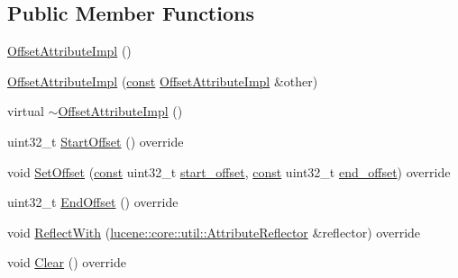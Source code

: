 \subsection*{Public Member Functions}
\begin{DoxyCompactItemize}
\item 
\mbox{\hyperlink{classlucene_1_1core_1_1analysis_1_1tokenattributes_1_1OffsetAttributeImpl_a424f18384e62360c38c1cd3e797dc80c}{Offset\+Attribute\+Impl}} ()
\item 
\mbox{\hyperlink{classlucene_1_1core_1_1analysis_1_1tokenattributes_1_1OffsetAttributeImpl_a1b302380db18cbe111ddc892b3b04841}{Offset\+Attribute\+Impl}} (\mbox{\hyperlink{ZlibCrc32_8h_a2c212835823e3c54a8ab6d95c652660e}{const}} \mbox{\hyperlink{classlucene_1_1core_1_1analysis_1_1tokenattributes_1_1OffsetAttributeImpl}{Offset\+Attribute\+Impl}} \&other)
\item 
virtual \mbox{\hyperlink{classlucene_1_1core_1_1analysis_1_1tokenattributes_1_1OffsetAttributeImpl_a6de20d33c5e4aed543d2386ccb3cef69}{$\sim$\+Offset\+Attribute\+Impl}} ()
\item 
uint32\+\_\+t \mbox{\hyperlink{classlucene_1_1core_1_1analysis_1_1tokenattributes_1_1OffsetAttributeImpl_afe05dd1af07cc98ff4baceb531ae5f0a}{Start\+Offset}} () override
\item 
void \mbox{\hyperlink{classlucene_1_1core_1_1analysis_1_1tokenattributes_1_1OffsetAttributeImpl_ab554b85bf6d64ce023c0634b3883c803}{Set\+Offset}} (\mbox{\hyperlink{ZlibCrc32_8h_a2c212835823e3c54a8ab6d95c652660e}{const}} uint32\+\_\+t \mbox{\hyperlink{classlucene_1_1core_1_1analysis_1_1tokenattributes_1_1OffsetAttributeImpl_a1e2b8c747f3f0216a9044b9fd61ea843}{start\+\_\+offset}}, \mbox{\hyperlink{ZlibCrc32_8h_a2c212835823e3c54a8ab6d95c652660e}{const}} uint32\+\_\+t \mbox{\hyperlink{classlucene_1_1core_1_1analysis_1_1tokenattributes_1_1OffsetAttributeImpl_a2e25d7e34687e7d39baaaf88636238c7}{end\+\_\+offset}}) override
\item 
uint32\+\_\+t \mbox{\hyperlink{classlucene_1_1core_1_1analysis_1_1tokenattributes_1_1OffsetAttributeImpl_a1e70ec558f605ea2313e41ba5c64e379}{End\+Offset}} () override
\item 
void \mbox{\hyperlink{classlucene_1_1core_1_1analysis_1_1tokenattributes_1_1OffsetAttributeImpl_ad7eb3a266863f7e14fbe1caa315c7151}{Reflect\+With}} (\mbox{\hyperlink{namespacelucene_1_1core_1_1util_a7dbb701adaed055f73fb95eec83da10a}{lucene\+::core\+::util\+::\+Attribute\+Reflector}} \&reflector) override
\item 
void \mbox{\hyperlink{classlucene_1_1core_1_1analysis_1_1tokenattributes_1_1OffsetAttributeImpl_af19f560600cc53e48c592aa6d9c48a91}{Clear}} () override

\end{DoxyCompactItemize}
